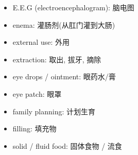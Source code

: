 \begin{multicols}{2}
\begin{itemize}
  \item E.E.G (electroencephalogram): 脑电图
  \item enema: 灌肠剂(从肛门灌到大肠)
  \item external use: 外用
  \item extraction: 取出, 拔牙, 摘除
  \item eye drops / ointment: 眼药水/膏
  \item eye patch: 眼罩
  \item family planning: 计划生育
  \item filling: 填充物
  \item solid / fluid food: 固体食物 / 流食
\end{itemize}
\end{multicols}